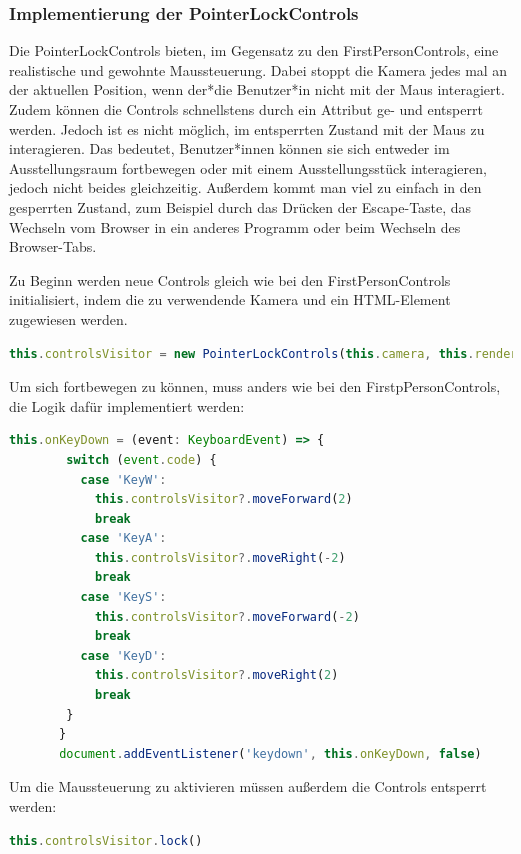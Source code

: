\subsubsection{Implementierung der PointerLockControls}

Die PointerLockControls bieten, im Gegensatz zu den FirstPersonControls, eine realistische und gewohnte Maussteuerung. Dabei stoppt die Kamera jedes mal an der aktuellen Position, wenn der*die Benutzer*in nicht mit der Maus interagiert. Zudem können die Controls schnellstens durch ein Attribut ge- und entsperrt werden. Jedoch ist es nicht möglich, im entsperrten Zustand mit der Maus zu interagieren. Das bedeutet, Benutzer*innen können sie sich entweder im Ausstellungsraum fortbewegen oder mit einem Ausstellungsstück interagieren, jedoch nicht beides gleichzeitig. Außerdem kommt man viel zu einfach in den gesperrten Zustand, zum Beispiel durch das Drücken der Escape-Taste, das Wechseln vom Browser in ein anderes Programm oder beim Wechseln des Browser-Tabs. 

Zu Beginn werden neue Controls gleich wie bei den FirstPersonControls initialisiert, indem die zu verwendende Kamera und ein HTML-Element zugewiesen werden.
\begin{lstlisting}[caption={PointerLockControls initialisieren},language=TypeScript]
    this.controlsVisitor = new PointerLockControls(this.camera, this.renderer.domElement)
    \end{lstlisting}

Um sich fortbewegen zu können, muss anders wie bei den FirstpPersonControls, die Logik dafür implementiert werden: 

\begin{lstlisting}[caption={Logik der PointerLockControls},language=TypeScript]
    this.onKeyDown = (event: KeyboardEvent) => {
        switch (event.code) {
          case 'KeyW':
            this.controlsVisitor?.moveForward(2)
            break
          case 'KeyA':
            this.controlsVisitor?.moveRight(-2)
            break
          case 'KeyS':
            this.controlsVisitor?.moveForward(-2)
            break
          case 'KeyD':
            this.controlsVisitor?.moveRight(2)
            break
        }
       }
       document.addEventListener('keydown', this.onKeyDown, false)
    \end{lstlisting}

Um die Maussteuerung zu aktivieren müssen außerdem die Controls entsperrt werden:

\begin{lstlisting}[caption={Controls entsperren},language=TypeScript]
    this.controlsVisitor.lock()
    \end{lstlisting}

